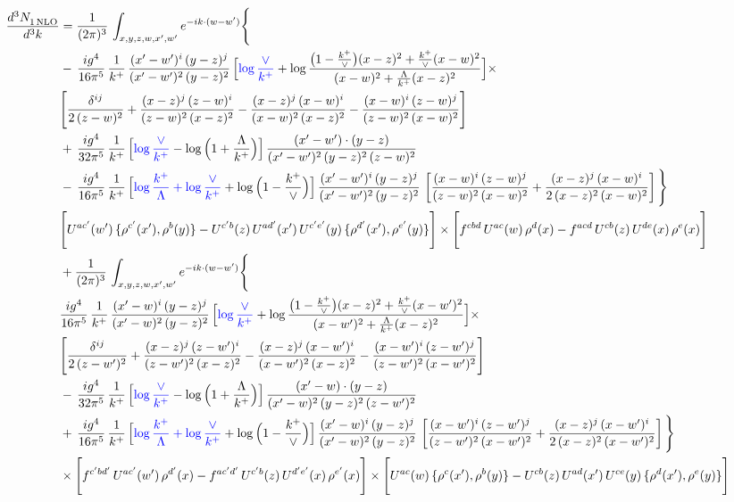 \documentclass[9pt]{article}
\numberwithin{equation}{section}
\begin{document}
\begin{align}
 \frac{d^{3}N_{1\,\rm NLO}^{\rm}}{d^{3}k}  & =    \frac{1}{(2\pi)^{3}}\,\int_{x,y,z,w,x',w^{\prime}} e^{-ik\cdot (w-w')}\Bigg\{ \notag \\ & -\, \frac{ig^{4}}{16\pi^{5}}\,\frac{1}{k^{+}}\, \frac{(x'-w')^{i}\,(y-z)^{j}}{(x'-w')^{2}\,(y-z)^{2}}\,\Big[{\color{blue}\log\frac{\vee}{k^{+}}}+\log\frac{\big(1-\frac{k^{+}}{\vee}\big)(x-z)^{2}+\frac{k^{+}}{\vee}(x-w)^{2}}{(x-w)^{2}+\frac{\Lambda}{k^{+}}(x-z)^{2}}\Big]\times\notag \\ &  \Bigg[\frac{\delta^{ij}}{2\,(z-w)^{2}}+\frac{(x-z)^{j}\,(z-w)^{i}}{(z-w)^{2}\,(x-z)^{2}}-\frac{(x-z)^{j}\,(x-w)^{i}}{(x-w)^{2}\,(x-z)^{2}}-\frac{(x-w)^{i}\,(z-w)^{j}}{(z-w)^{2}\,(x-w)^{2}}\Bigg]\notag \\ & +\,\frac{ig^{4}}{32\pi^{5}}\,\frac{1}{k^{+}}\,\Big[{\color{blue}\log\frac{\vee}{k^{+}}}-\log\Big(1+\frac{\Lambda}{k^{+}}\Big)\Big]\, \frac{(x'-w')\cdot (y-z)}{(x'-w')^{2}\,(y-z)^{2}\,(z-w)^{2}}\notag \\ & -\, \frac{ig^{4}}{16\pi^{5}}\,\frac{1}{k^{+}}\,\Big[{\color{blue}\log\frac{k^{+}}{\Lambda}+\log\frac{\vee}{k^{+}}}+\log\Big(1-\frac{k^{+}}{\vee}\Big)\Big]\,\frac{(x'-w')^{i}\,(y-z)^{j}}{(x'-w')^{2}\,(y-z)^{2}}\,\left[\frac{(x-w)^{i}\,(z-w)^{j}}{(z-w)^{2}\,(x-w)^{2}}+\frac{(x-z)^{j}\,(x-w)^{i}}{2\,(x-z)^{2}\, (x-w)^{2}}\right]\Bigg\} \notag \\ & \Bigg[U^{ac'}(w')\,\{\rho^{c'}(x'),\rho^{b}(y)\}-U^{c'b}(z)\,U^{ad'}(x')\,U^{c'e'}(y)\, \{\rho^{d'}(x'),\rho^{e'}(y)\}\Bigg]\times \Bigg[f^{cbd}\,U^{ac}(w)\,\rho^{d}(x)-f^{acd}\, U^{cb}(z)\,U^{de}(x)\,\rho^{e}(x)\Bigg]\notag \\ & + \frac{1}{(2\pi)^{3}}\,\int_{x,y,z,w,x',w^{\prime}} e^{-ik\cdot (w-w')}\Bigg\{ \notag \\ &  \frac{ig^{4}}{16\pi^{5}}\,\frac{1}{k^{+}}\, \frac{(x'-w)^{i}\,(y-z)^{j}}{(x'-w)^{2}\,(y-z)^{2}}\,\Big[{\color{blue}\log\frac{\vee}{k^{+}}}+\log\frac{\big(1-\frac{k^{+}}{\vee}\big)(x-z)^{2}+\frac{k^{+}}{\vee}(x-w')^{2}}{(x-w')^{2}+\frac{\Lambda}{k^{+}}(x-z)^{2}}\Big]\times\notag \\ &  \Bigg[\frac{\delta^{ij}}{2\,(z-w')^{2}}+\frac{(x-z)^{j}\,(z-w')^{i}}{(z-w')^{2}\,(x-z)^{2}}-\frac{(x-z)^{j}\,(x-w')^{i}}{(x-w')^{2}\,(x-z)^{2}}-\frac{(x-w')^{i}\,(z-w')^{j}}{(z-w')^{2}\,(x-w')^{2}}\Bigg]\notag \\ & -\,\frac{ig^{4}}{32\pi^{5}}\,\frac{1}{k^{+}}\,\Big[{\color{blue}\log\frac{\vee}{k^{+}}}-\log\Big(1+\frac{\Lambda}{k^{+}}\Big)\Big]\, \frac{(x'-w)\cdot (y-z)}{(x'-w)^{2}\,(y-z)^{2}\,(z-w')^{2}}\notag \\ & +\,\frac{ig^{4}}{16\pi^{5}}\,\frac{1}{k^{+}}\,\Big[{\color{blue}\log\frac{k^{+}}{\Lambda}+\log\frac{\vee}{k^{+}}}+\log\Big(1-\frac{k^{+}}{\vee}\Big)\Big]\,\frac{(x'-w)^{i}\,(y-z)^{j}}{(x'-w)^{2}\,(y-z)^{2}}\,\left[\frac{(x-w')^{i}\,(z-w')^{j}}{(z-w')^{2}\,(x-w')^{2}}+\frac{(x-z)^{j}\,(x-w')^{i}}{2\,(x-z)^{2}\, (x-w')^{2}}\right] \Bigg\} \notag \\ & \times\Bigg[f^{c'bd'}\,U^{ac'}(w')\,\rho^{d'}(x)-f^{ac'd'}\, U^{c'b}(z)\,U^{d'e'}(x)\,\rho^{e'}(x)\Bigg] \times \Bigg[U^{ac}(w)\,\{\rho^{c}(x'),\rho^{b}(y)\}-U^{cb}(z)\,U^{ad}(x')\,U^{ce}(y)\, \{\rho^{d}(x'),\rho^{e}(y)\}\Bigg]
\end{align}
\end{document}
